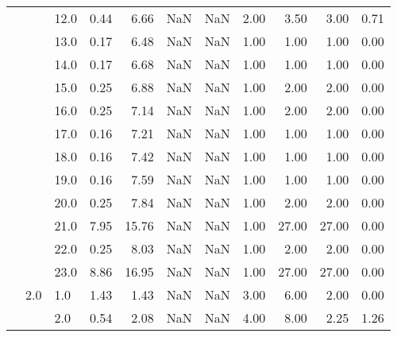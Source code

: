 \begin{tabular}{lllrrrrrrrr}
       &     & 12.0 &      0.44 &       6.66 &               NaN &                NaN & 2.00 &   3.50 &             3.00 &                         0.71 \\
       &     & 13.0 &      0.17 &       6.48 &               NaN &                NaN & 1.00 &   1.00 &             1.00 &                         0.00 \\
       &     & 14.0 &      0.17 &       6.68 &               NaN &                NaN & 1.00 &   1.00 &             1.00 &                         0.00 \\
       &     & 15.0 &      0.25 &       6.88 &               NaN &                NaN & 1.00 &   2.00 &             2.00 &                         0.00 \\
       &     & 16.0 &      0.25 &       7.14 &               NaN &                NaN & 1.00 &   2.00 &             2.00 &                         0.00 \\
       &     & 17.0 &      0.16 &       7.21 &               NaN &                NaN & 1.00 &   1.00 &             1.00 &                         0.00 \\
       &     & 18.0 &      0.16 &       7.42 &               NaN &                NaN & 1.00 &   1.00 &             1.00 &                         0.00 \\
       &     & 19.0 &      0.16 &       7.59 &               NaN &                NaN & 1.00 &   1.00 &             1.00 &                         0.00 \\
       &     & 20.0 &      0.25 &       7.84 &               NaN &                NaN & 1.00 &   2.00 &             2.00 &                         0.00 \\
       &     & 21.0 &      7.95 &      15.76 &               NaN &                NaN & 1.00 &  27.00 &            27.00 &                         0.00 \\
       &     & 22.0 &      0.25 &       8.03 &               NaN &                NaN & 1.00 &   2.00 &             2.00 &                         0.00 \\
       &     & 23.0 &      8.86 &      16.95 &               NaN &                NaN & 1.00 &  27.00 &            27.00 &                         0.00 \\
       & 2.0 & 1.0  &      1.43 &       1.43 &               NaN &                NaN & 3.00 &   6.00 &             2.00 &                         0.00 \\
       &     & 2.0  &      0.54 &       2.08 &               NaN &                NaN & 4.00 &   8.00 &             2.25 &                         1.26 \\

\end{tabular}
